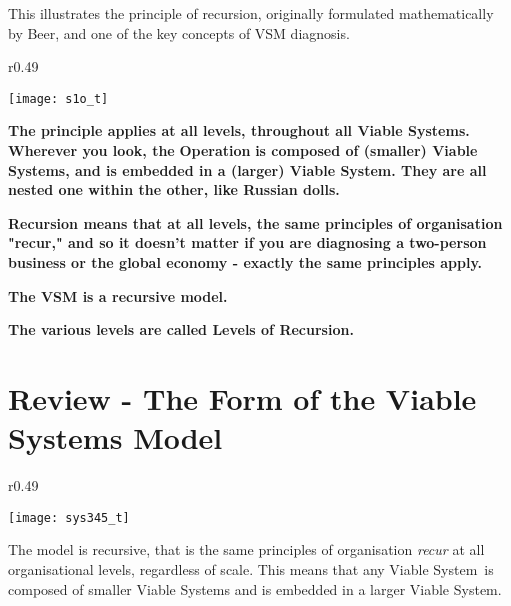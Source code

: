 This illustrates the principle of recursion, originally formulated mathematically by Beer, and one of the key concepts of VSM diagnosis.

\vspace{\baselineskip}

\begin{wrapfigure}[18]{r}{0.49\textwidth}
    \begin{center}
        \texttt{[image: s1o\_t]}
    \end{center}
\end{wrapfigure}

\textbf{The principle applies at all levels, throughout all Viable Systems. Wherever you look, the}
\textcolor{O}{\textbf{Operation}}
\textbf{is composed of (smaller) Viable Systems, and is embedded in a (larger) Viable System. They are all nested one within the other, like Russian dolls.}

\textbf{Recursion means that at all levels, the same principles of organisation "recur," and so it doesn't matter if you are diagnosing a two-person business or the global economy - exactly the same principles apply.}

\textbf{The VSM is a recursive model.}

\textbf{The various levels are called Levels of Recursion.}

\section*{Review - The Form of the Viable Systems Model}

\begin{wrapfigure}[15]{r}{0.49\textwidth}
    \begin{center}
        \texttt{[image: sys345\_t]}
    \end{center}
\end{wrapfigure}

The model is recursive, that is the same principles of organisation \textit{recur} at all organisational levels, regardless of scale. This means that any Viable System is composed of smaller Viable Systems and is embedded in a larger Viable System.
